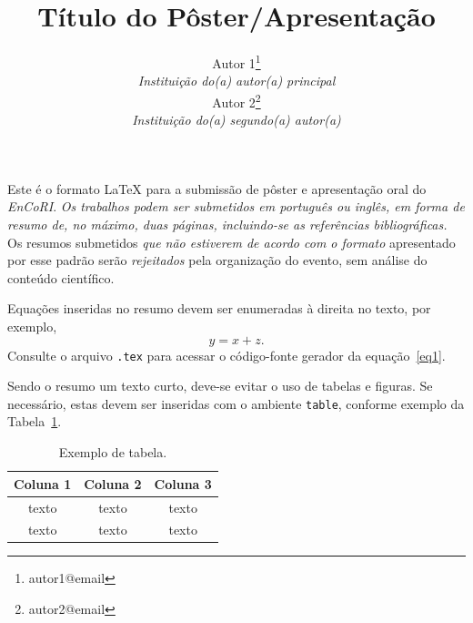 \documentclass{encori}
\begin{document}
\title{Título do Pôster/Apresentação}


\author{
    {\large Autor 1}\thanks{autor1@email}\\ 
    {\small \textit{Instituição do(a) autor(a) principal}} \\
    {\large Autor 2}\thanks{autor2@email}\\
    {\small \textit{Instituição do(a) segundo(a) autor(a)}} 
}
\criartitulo


Este é o formato \LaTeX{} para a submissão de pôster e apresentação oral do \emph{EnCoRI}. \emph{Os trabalhos podem ser submetidos em português ou inglês, em forma de resumo de, no máximo, duas páginas, incluindo-se as referências bibliográficas.} Os resumos submetidos \emph{que não estiverem de acordo com o formato} apresentado por esse padrão serão \emph{rejeitados} pela organização do evento, sem análise do conteúdo científico.

Equações inseridas no resumo devem ser enumeradas à direita no texto, por exemplo,
\begin{equation}
y = x + z.
\label{eq1}
\end{equation}
Consulte o arquivo \verb!.tex! para acessar o código-fonte gerador da equação~\eqref{eq1}.

Sendo o resumo um texto curto, deve-se evitar o uso de tabelas e figuras. Se necessário, estas devem ser inseridas com o ambiente \verb!table!, conforme exemplo da Tabela~\ref{tabela01}.

\begin{table}[H]
\caption{{\small Exemplo de tabela.}}
\centering
\begin{tabular}{ccc}
\hline
Coluna 1  & Coluna 2 & Coluna 3\\ \hline
texto   & texto   & texto    \\
texto   & texto   & texto \\
\hline
\end{tabular}\label{tabela01}
\end{table}
\end{document}
